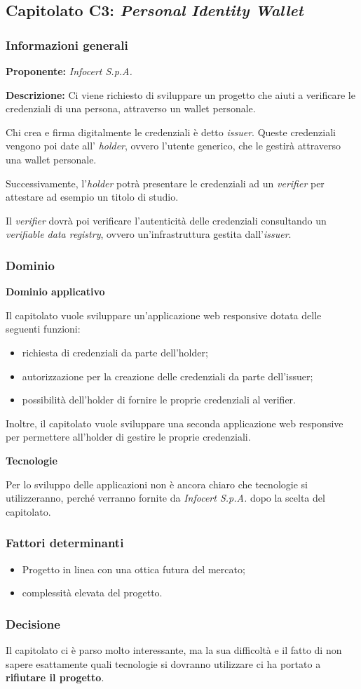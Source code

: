 \subsection{Capitolato C3: \textit{Personal Identity Wallet}}
\subsubsection{Informazioni generali}
\textbf{Proponente:} \textit{Infocert S.p.A.}

\textbf{Descrizione:} Ci viene richiesto di sviluppare un progetto che aiuti a verificare le credenziali di una persona, attraverso un wallet personale.

Chi crea e firma digitalmente le credenziali è detto \textit{issuer}. Queste credenziali vengono poi date all' \textit{holder}, ovvero l'utente generico, che le gestirà attraverso una wallet personale.

Successivamente, l'\textit{holder} potrà presentare le credenziali ad un \textit{verifier} per attestare ad esempio un titolo di studio.

Il \textit{verifier} dovrà poi verificare l'autenticità delle credenziali consultando un \textit{verifiable data registry}, ovvero un'infrastruttura gestita dall'\textit{issuer}.

\subsubsection{Dominio}
\textbf{Dominio applicativo}

Il capitolato vuole sviluppare un'applicazione web responsive dotata delle seguenti funzioni:
\begin{itemize}
    \item richiesta di credenziali da parte dell'holder;
    \item autorizzazione per la creazione delle credenziali da parte dell'issuer;
    \item possibilità dell'holder di fornire le proprie credenziali al verifier.
\end{itemize}
Inoltre, il capitolato vuole sviluppare una seconda applicazione web responsive per permettere all'holder di gestire le proprie credenziali.

\textbf{Tecnologie}

Per lo sviluppo delle applicazioni non è ancora chiaro che tecnologie si utilizzeranno, perché verranno fornite da \textit{Infocert S.p.A.} dopo la scelta del capitolato.

\subsubsection{Fattori determinanti}
\begin{itemize}
    \item Progetto in linea con una ottica futura del mercato;
    \item complessità elevata del progetto.
\end{itemize}
\subsubsection{Decisione}
Il capitolato ci è parso molto interessante, ma la sua difficoltà e il fatto di non sapere esattamente quali tecnologie si dovranno utilizzare ci ha portato a \textbf{rifiutare il progetto}.

